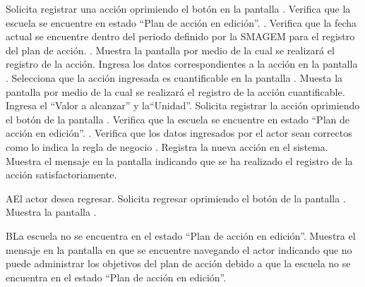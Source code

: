  
\begin{UCtrayectoria}
	\UCpaso[\UCactor] Solicita registrar una acción oprimiendo el botón  en la pantalla . 
	\UCpaso[\UCsist] Verifica que la escuela se encuentre en  estado ``Plan de acción en edición''. .
    \UCpaso[\UCsist] Verifica que la fecha actual se encuentre dentro del periodo definido por la SMAGEM para el registro del plan de acción. .
	\UCpaso[\UCsist] Muestra la pantalla  por medio de la cual se realizará el registro de la acción.
	\UCpaso[\UCactor] Ingresa los datos correspondientes a la acción en la pantalla . \label{cup8:ingresaDatos}
	\UCpaso[\UCactor] Selecciona que la acción ingresada es cuantificable en la pantalla .  \label{cup8:selecciona}
	\UCpaso[\UCsist] Muesta la pantalla  por medio de la cual se realizará el registro de la acción cuantificable.
	\UCpaso[\UCactor] Ingresa el ``Valor a alcanzar''  y la``Unidad''.
	\UCpaso[\UCactor] Solicita registrar la acción oprimiendo el botón  de la pantalla .  \label{cup8:registrar}
	\UCpaso[\UCsist] Verifica que la escuela se encuentre en  estado ``Plan de acción en edición''. .
	\UCpaso[\UCsist] Verifica que los datos ingresados por el actor sean correctos como lo indica la regla de negocio .    
	\UCpaso[\UCsist] Registra la nueva acción en el sistema.
	\UCpaso[\UCsist] Muestra el mensaje  en la pantalla  indicando que se ha realizado el registro de la acción satisfactoriamente.
\end{UCtrayectoria}



\begin{UCtrayectoriaA}{A}{El actor desea regresar.}
	\UCpaso[\UCactor] Solicita regresar oprimiendo el botón  de la pantalla .
	\UCpaso[\UCsist] Muestra la pantalla  .
\end{UCtrayectoriaA} 

\begin{UCtrayectoriaA}{B}{La escuela no se encuentra en el estado ``Plan de acción en edición''.}
    \UCpaso[\UCsist] Muestra el mensaje  en la pantalla en que se encuentre navegando el actor indicando que no puede administrar los objetivos del plan de acción debido a que la escuela no se encuentra en el estado ``Plan de acción en edición''. 
 \end{UCtrayectoriaA}
 
